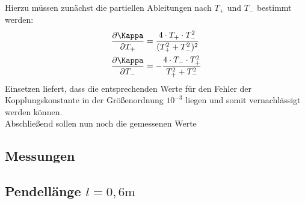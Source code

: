 Hierzu müssen zunächst die partiellen Ableitungen nach $T_{+}$ und $T_{-}$ bestimmt werden:
\begin{align}
  \frac{\partial \Kappa}{\partial T_{+}} &= \frac{4 \cdot T_{+} \cdot T_{-}^2}{(T_{+}^2 + T_{-}^2)^2} \\
  \frac{\partial \Kappa}{\partial T_{-}} &= - \frac{4 \cdot T_{-} \cdot T_{+}^2 }{T_{+}^2 + T_{-}^2}
\end{align}
Einsetzen liefert, dass die entsprechenden Werte für den Fehler der Kopplungskonstante in der Größenordnung $10^{-3}$ liegen und somit
vernachlässigt werden können. \\
Abschließend sollen nun noch die gemessenen Werte

\begin{minipage}{\textwidth}

 \hfill

\end{minipage}



\subsection{Messungen}
\begin{minipage}{\textwidth}

 \hfill

\end{minipage}


\begin{minipage}{\textwidth}

 \hfill

\end{minipage}

\begin{minipage}{\textwidth}

 \hfill

\end{minipage}


\subsection{Pendellänge $l = 0,6 \si{\meter} $}
\begin{minipage}{\textwidth}

 \hfill

\end{minipage}


\begin{minipage}{\textwidth}

 \hfill

\end{minipage}

\begin{minipage}{\textwidth}

 \hfill

\end{minipage}
